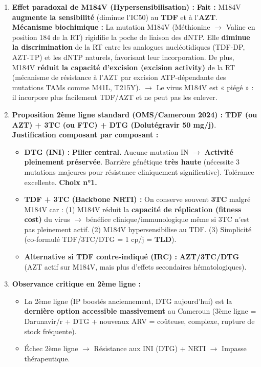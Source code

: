 \documentclass[11pt]{article}
\begin{document}
\begin{exoresolu}
\begin{enumerate}
\begin{itemize}
    \end{itemize}
    \item \textbf{Effet paradoxal de M184V (Hypersensibilisation) :}
    \textbf{Fait :} M184V \textbf{augmente la sensibilité} (diminue l'IC50) au \textbf{TDF} et à l'\textbf{AZT}.
    \textbf{Mécanisme biochimique :} La mutation M184V (Méthionine $\rightarrow$ Valine en position 184 de la RT) rigidifie la poche de liaison des dNTP. Elle \textbf{diminue la discrimination} de la RT entre les analogues nucléotidiques (TDF-DP, AZT-TP) et les dNTP naturels, favorisant leur incorporation. De plus, M184V \textbf{réduit la capacité d'excision (excision activity)} de la RT (mécanisme de résistance à l'AZT par excision ATP-dépendante des mutations TAMs comme M41L, T215Y). $\rightarrow$ Le virus M184V est « piégé » : il incorpore plus facilement TDF/AZT et ne peut pas les enlever.
    \item \textbf{Proposition 2ème ligne standard (OMS/Cameroun 2024) :} \textbf{TDF (ou AZT) + 3TC (ou FTC) + DTG (Dolutégravir 50 mg/j)}.
    \textbf{Justification composant par composant :}
    \begin{itemize}
        \item \textbf{DTG (INI) :} \textbf{Pilier central.} Aucune mutation IN $\rightarrow$ \textbf{Activité pleinement préservée}. Barrière génétique \textbf{très haute} (nécessite 3 mutations majeures pour résistance cliniquement significative). Tolérance excellente. \textbf{Choix n°1.}
        \item \textbf{TDF + 3TC (Backbone NRTI) :} On conserve souvent \textbf{3TC} malgré M184V car : (1) M184V réduit la \textbf{capacité de réplication (fitness cost)} du virus $\rightarrow$ bénéfice clinique/immunologique même si 3TC n'est pas pleinement actif. (2) M184V hypersensibilise au TDF. (3) Simplicité (co-formulé TDF/3TC/DTG = 1 cp/j = \textbf{TLD}).
        \item \textbf{Alternative si TDF contre-indiqué (IRC) :} \textbf{AZT/3TC/DTG} (AZT actif sur M184V, mais plus d'effets secondaires hématologiques).
    \end{itemize}
    \item \textbf{Observance critique en 2ème ligne :}
    \begin{itemize}
        \item La 2ème ligne (IP boostés anciennement, DTG aujourd'hui) est la \textbf{dernière option accessible massivement} au Cameroun (3ème ligne = Darunavir/r + DTG + nouveaux ARV = coûteuse, complexe, rupture de stock fréquente).
        \item Échec 2ème ligne $\rightarrow$ Résistance aux INI (DTG) + NRTI $\rightarrow$ Impasse thérapeutique.

\end{itemize}
\end{enumerate}
\end{exoresolu}
\end{document}
